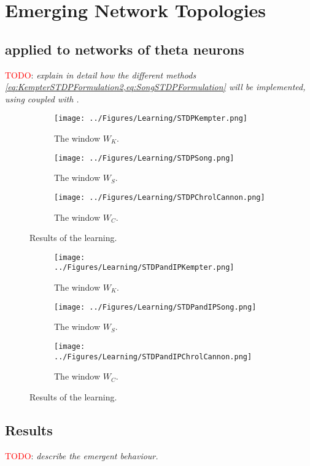 \newpage
\section{\mywork Emerging Network Topologies}
\subsection{\STDP applied to networks of theta neurons}
\textcolor{red}{TODO}: \textsl{explain in detail how the different methods \cref{eq:KempterSTDPFormulation2,eq:SongSTDPFormulation} will be implemented, using \STDP coupled with \IP.}

\begin{figure}[H]
\centering
\begin{subfigure}[b]{0.32\linewidth}
   \centering
  \texttt{[image: ../Figures/Learning/STDPKempter.png]}
   \caption{The window $W_K$.}
   \label{fig:STDPWK} 
\end{subfigure} \hfill
\begin{subfigure}[b]{0.32\linewidth}
   \centering
  \texttt{[image: ../Figures/Learning/STDPSong.png]}
   \caption{The window $W_S$.}
   \label{fig:STDPWS}
\end{subfigure} \hfill
\begin{subfigure}[b]{0.32\linewidth}
   \centering
  \texttt{[image: ../Figures/Learning/STDPChrolCannon.png]}
   \caption{The window $W_C$.}
   \label{fig:STDPWC}
\end{subfigure}
   \caption{Results of the \STDP learning.}
   \label{fig:STDPresults}
\end{figure}

\newpage 

\begin{figure}[H]
\centering
\begin{subfigure}[b]{0.32\linewidth}
   \centering
  \texttt{[image: ../Figures/Learning/STDPandIPKempter.png]}
   \caption{The window $W_K$.}
   \label{fig:STDPWK} 
\end{subfigure} \hfill
\begin{subfigure}[b]{0.32\linewidth}
   \centering
  \texttt{[image: ../Figures/Learning/STDPandIPSong.png]}
   \caption{The window $W_S$.}
   \label{fig:STDPWS}
\end{subfigure} \hfill
\begin{subfigure}[b]{0.32\linewidth}
   \centering
  \texttt{[image: ../Figures/Learning/STDPandIPChrolCannon.png]}
   \caption{The window $W_C$.}
   \label{fig:STDPWC}
\end{subfigure}
   \caption{Results of the \STDP learning.}
   \label{fig:STDPresults}
\end{figure}



\subsection{Results}
\textcolor{red}{TODO}: \textsl{describe the emergent behaviour.}

